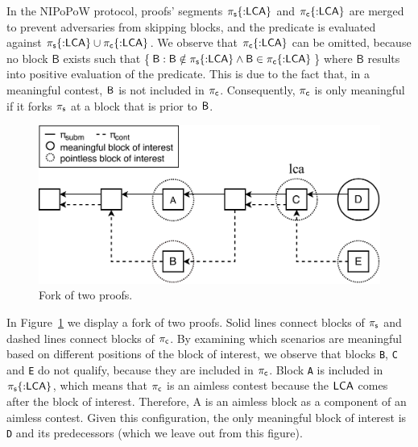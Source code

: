 \newcommand{\block}{\mathsf{B}}

In the NIPoPoW protocol, proofs' segments $\mathsf{\pi_{s}}\{{{:}}\mathsf{LCA}\}$ and
$\mathsf{\pi_{c}}\{{:}\mathsf{LCA}\}$ are merged to prevent adversaries from skipping
blocks, and the predicate is evaluated against $\mathsf{\pi_{s}}\{{:}\mathsf{LCA}\} \cup
\mathsf{\pi_{c}}\{{:}\mathsf{LCA}\}$. We observe that $\mathsf{\pi_{c}}\{{:}\mathsf{LCA}\}$ can be omitted, because no
block $\block$ exists such that \{$\block : \block \notin \pis\{{:}\lca\} \land
\block \in \pic\{{:}\lca\}$\} where $\block$ results into positive evaluation
of the predicate. This is due to the fact that, in a meaningful contest, $\mathsf{B}$
is not included in $\mathsf{\pi_{c}}$. Consequently, $\mathsf{\pi_{c}}$ is only meaningful if it forks
$\mathsf{\pi_{s}}$ at a block that is prior to $\mathsf{B}$.

\renewcommand{\block}{}

\begin{figure}[h]
\vspace*{-3mm}
    \begin{center}
        \includegraphics[width=0.8\columnwidth]{figures/boi-position.pdf}
    \end{center}
    \caption{Fork of two proofs.
    }
    \label{fig:boi-position}
\vspace*{-3mm}
\end{figure}

In Figure~\ref{fig:boi-position} we display a fork of two proofs. Solid lines
connect blocks of $\mathsf{\pi_{s}}$ and dashed lines connect blocks of $\mathsf{\pi_{c}}$. By
examining which scenarios are meaningful based on different positions of the
block of interest, we observe that blocks \texttt{B}, \texttt{C} and \texttt{E}
do not qualify, because they are included in $\mathsf{\pi_{c}}$. Block \texttt{A} is
included in $\mathsf{\pi_{s}}\{{:}\mathsf{LCA}\}$, which means that $\mathsf{\pi_{c}}$ is an aimless contest
because the $\mathsf{LCA}$ comes after the block of interest. Therefore, A is an
aimless block as a component of an aimless contest. Given this configuration,
the only meaningful block of interest is \texttt{D} and its predecessors (which
we leave out from this figure).

